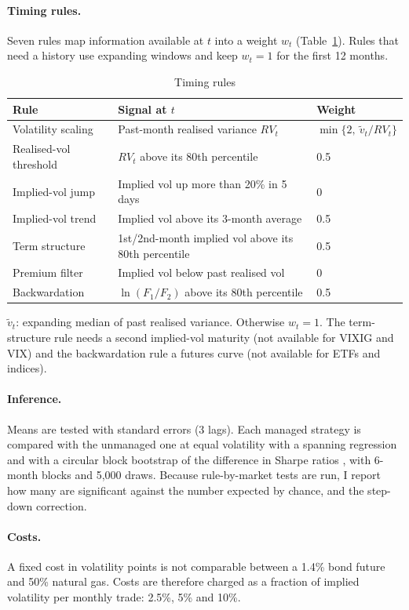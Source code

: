 \documentclass[11pt,a4paper]{article}
\theoremstyle{remark}
\newcommand{\note}[1]{\par\smallskip\parbox{\linewidth}{\footnotesize #1}}
\begin{document}
\paragraph{Timing rules.} Seven rules map information available at $t$ into a weight $w_t$ (Table~\ref{tab:rules}). Rules that need a history use expanding windows and keep $w_t=1$ for the first 12 months.

\begin{table}[H]
\centering
\caption{Timing rules}
\label{tab:rules}
\small
\begin{tabular}{lll}
\toprule
Rule & Signal at $t$ & Weight \\
\midrule
Volatility scaling & Past-month realised variance $RV_t$ & $\min\{2,\ \tilde v_t / RV_t\}$ \\
Realised-vol threshold & $RV_t$ above its 80th percentile & 0.5 \\
Implied-vol jump & Implied vol up more than 20\% in 5 days & 0 \\
Implied-vol trend & Implied vol above its 3-month average & 0.5 \\
Term structure & 1st/2nd-month implied vol above its 80th percentile & 0.5 \\
Premium filter & Implied vol below past realised vol & 0 \\
Backwardation & $\ln(F_1/F_2)$ above its 80th percentile & 0.5 \\
\bottomrule
\end{tabular}
\note{$\tilde v_t$: expanding median of past realised variance. Otherwise $w_t=1$. The term-structure rule needs a second implied-vol maturity (not available for VIXIG and VIX) and the backwardation rule a futures curve (not available for ETFs and indices).}
\end{table}

\paragraph{Inference.} Means are tested with \citet{neweywest1987} standard errors (3 lags). Each managed strategy is compared with the unmanaged one at equal volatility with a spanning regression and with a circular block bootstrap of the difference in Sharpe ratios \citep{politis1992,ledoitwolf2008}, with 6-month blocks and 5{,}000 draws. Because \NTests{} rule-by-market tests are run, I report how many are significant against the number expected by chance, and the \citet{holm1979} step-down correction.

\paragraph{Costs.} A fixed cost in volatility points is not comparable between a 1.4\% bond future and 50\% natural gas. Costs are therefore charged as a fraction of implied volatility per monthly trade: 2.5\%, 5\% and 10\%.
\end{document}
